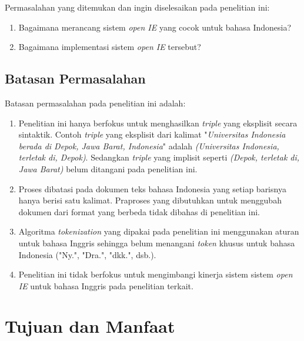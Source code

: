 Permasalahan yang ditemukan dan ingin diselesaikan pada penelitian ini:

\begin{enumerate}
\item Bagaimana merancang sistem \textit{open IE} yang cocok untuk bahasa Indonesia?
\item Bagaimana implementasi sistem \textit{open IE} tersebut?
\end{enumerate}

\subsection{Batasan Permasalahan}

Batasan permasalahan pada penelitian ini adalah:

\begin{enumerate}
\item Penelitian ini hanya berfokus untuk menghasilkan \textit{triple} yang eksplisit secara sintaktik. Contoh \textit{triple} yang eksplisit dari kalimat "\textit{Universitas Indonesia berada di Depok, Jawa Barat, Indonesia}" adalah \textit{(Universitas Indonesia, terletak di, Depok)}. Sedangkan \textit{triple} yang implisit seperti \textit{(Depok, terletak di, Jawa Barat)} belum ditangani pada penelitian ini.

\item Proses dibatasi pada dokumen teks bahasa Indonesia yang setiap barisnya hanya berisi satu kalimat. Praproses yang dibutuhkan untuk menggubah dokumen dari format yang berbeda tidak dibahas di penelitian ini.

\item Algoritma \textit{tokenization} yang dipakai pada penelitian ini menggunakan aturan untuk bahasa Inggris sehingga belum menangani \textit{token} khusus untuk bahasa Indonesia ("Ny.", "Dra.", "dkk.", dsb.).

\item Penelitian ini tidak berfokus untuk mengimbangi kinerja sistem sistem \textit{open IE} untuk bahasa Inggris pada penelitian terkait.

\end{enumerate}

\section{Tujuan dan Manfaat}


